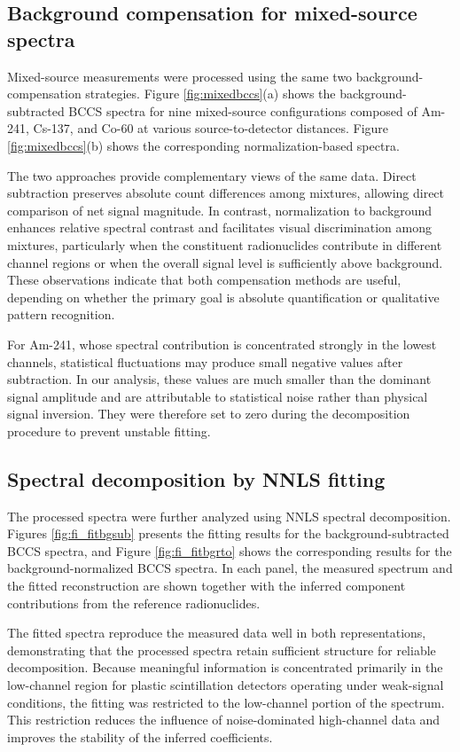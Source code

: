 \documentclass[fleqn, 10pt]{wlscirep}
\begin{document}
\subsection*{Background compensation for mixed-source spectra}

Mixed-source measurements were processed using the same two background-compensation strategies. Figure \ref{fig:mixedbccs}(a) shows the background-subtracted BCCS spectra for nine mixed-source configurations composed of Am-241, Cs-137, and Co-60 at various source-to-detector distances. Figure \ref{fig:mixedbccs}(b) shows the corresponding normalization-based spectra.

The two approaches provide complementary views of the same data. Direct subtraction preserves absolute count differences among mixtures, allowing direct comparison of net signal magnitude. In contrast, normalization to background enhances relative spectral contrast and facilitates visual discrimination among mixtures, particularly when the constituent radionuclides contribute in different channel regions or when the overall signal level is sufficiently above background. These observations indicate that both compensation methods are useful, depending on whether the primary goal is absolute quantification or qualitative pattern recognition.

For Am-241, whose spectral contribution is concentrated strongly in the lowest channels, statistical fluctuations may produce small negative values after subtraction. In our analysis, these values are much smaller than the dominant signal amplitude and are attributable to statistical noise rather than physical signal inversion. They were therefore set to zero during the decomposition procedure to prevent unstable fitting.


\subsection*{Spectral decomposition by NNLS fitting}

The processed spectra were further analyzed using NNLS spectral decomposition. Figures \ref{fig:fi_fitbgsub} presents the fitting results for the background-subtracted BCCS spectra, and Figure \ref{fig:fi_fitbgrto} shows the corresponding results for the background-normalized BCCS
spectra. In each panel, the measured spectrum and the fitted reconstruction are shown together with the inferred component contributions from the reference radionuclides.

The fitted spectra reproduce the measured data well in both representations, demonstrating that the processed spectra retain sufficient structure for reliable decomposition. Because meaningful information is concentrated primarily in the low-channel region for plastic scintillation detectors operating under weak-signal conditions, the fitting was restricted to the low-channel portion of the spectrum. This restriction reduces the influence of noise-dominated high-channel data and improves the stability of the inferred coefficients.
\end{document}
